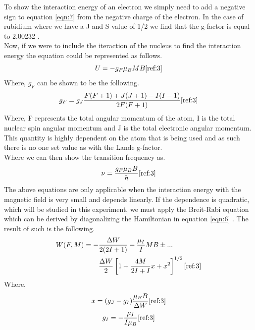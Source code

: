 \documentclass[twocolumn]{article}
\begin{document}
To show the interaction energy of an electron we simply need to add a negative 
sign to equation \ref{eqn:7} from the negative charge of the electron. In the 
case of rubidium where we have a J and S value of 1/2 we find that the g-factor 
is equal to 2.00232 \cite{ref:3}.
\\
Now, if we were to include the iteraction of the nucleus to find the 
interaction energy the equation could be represented as follows.
\begin{equation}
U = -g_F\mu_B M B
\label{eqn:9}
\cite{ref:3}
\end{equation}
Where, $g_F$ can be shown to be the following.
\begin{equation}
g_F = g_J\frac{F(F+1)+J(J+1)-I(I-1)}{2F(F+1)}
\label{eqn:10}
\cite{ref:3}
\end{equation}
Where, F represents the total angular momentum of the atom, I is the total 
nuclear spin angular momentum and J is the total electronic angular momentum. 
This quantity is highly dependent on the atom that is being used and as such 
there is no one set value as with the Lande g-factor.
\\
Where we can then show the transition frequency as.
\begin{equation}
\nu = \frac{g_F\mu_B B}{h}
\label{eqn:11}
\cite{ref:3}
\end{equation}
The above equations are only applicable when the interaction energy with the 
magnetic field is very small and depends linearly. If the dependence is 
quadratic, which will be studied in this experiment, we must apply the 
Breit-Rabi equation which can be derived by diagonalizing the Hamiltonian in 
equation \ref{eqn:6} \cite{ref:3}. The result of such is the following.
\begin{equation}
\begin{aligned}
W(F,M) = -&\frac{\Delta W}{2(2I+1)}-\frac{\mu_I}{I}MB\pm ...
\\
          &\frac{\Delta W}{2}\left[1+\frac{4M}{2I+I}x+x^2\right]^{1/2}
\label{eqn:12}
\cite{ref:3}
\end{aligned}
\end{equation}
Where,
\begin{equation}
x = (g_J - g_I)\frac{\mu_B B}{\Delta W}
\label{eqn:13}
\cite{ref:3}
\end{equation}
\begin{equation}
g_I = -\frac{\mu_I}{I\mu_B}
\label{eqn:14}
\cite{ref:3}
\end{equation}
\end{document}
